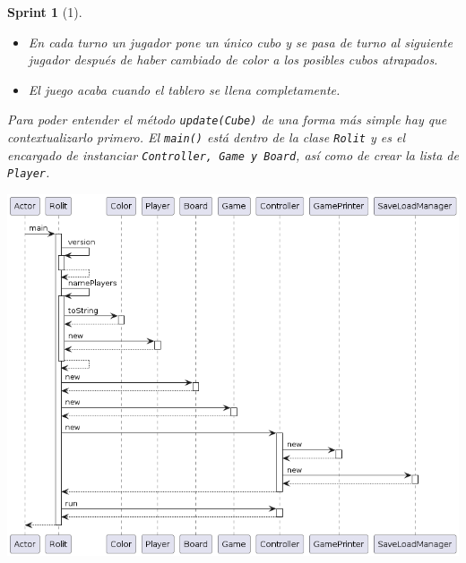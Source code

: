 \documentclass[12pt,a4paper,openright]{book}
\theoremstyle{break}
\newtheorem*{sprint}{Sprint}
\begin{document}
\begin{sprint}[1]
\begin{itemize}
\item En cada turno un jugador pone un único cubo y se pasa de turno al siguiente jugador después de haber cambiado de color a los posibles cubos atrapados.

\item El juego acaba cuando el tablero se llena completamente.
\end{itemize} 

Para poder entender el método \texttt{update(Cube)} de una forma más simple hay que contextualizarlo primero. El \texttt{main()} está dentro de la clase \texttt{Rolit} y es el encargado de instanciar \texttt{Controller, Game y Board}, así como de crear la lista de \texttt{Player}.
\begin{center}
\includegraphics[scale=0.4]{mainS1.png}
\end{center}


\end{sprint}
\end{document}
